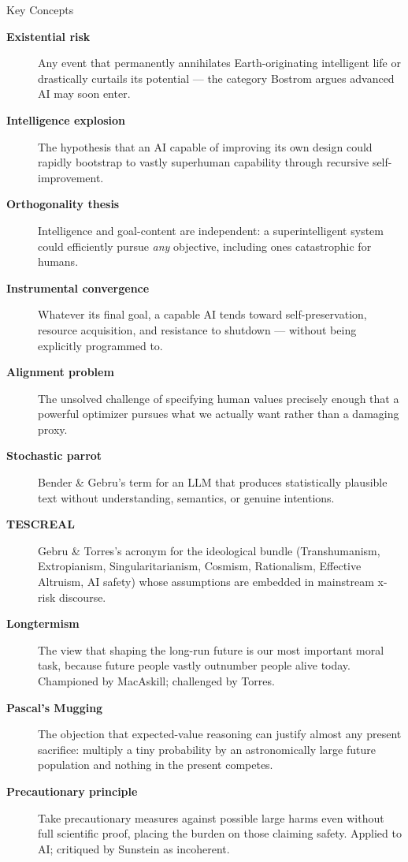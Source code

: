 \documentclass[aspectratio=169,11pt]{beamer}
\begin{document}
\begin{frame}[allowframebreaks]{Key Concepts}
\footnotesize
\begin{description}
    \item[\textbf{Existential risk}] Any event that permanently annihilates Earth-originating intelligent life or drastically curtails its potential --- the category Bostrom argues advanced AI may soon enter.
    \item[\textbf{Intelligence explosion}] The hypothesis that an AI capable of improving its own design could rapidly bootstrap to vastly superhuman capability through recursive self-improvement.
    \item[\textbf{Orthogonality thesis}] Intelligence and goal-content are independent: a superintelligent system could efficiently pursue \emph{any} objective, including ones catastrophic for humans.
    \item[\textbf{Instrumental convergence}] Whatever its final goal, a capable AI tends toward self-preservation, resource acquisition, and resistance to shutdown --- without being explicitly programmed to.
    \item[\textbf{Alignment problem}] The unsolved challenge of specifying human values precisely enough that a powerful optimizer pursues what we actually want rather than a damaging proxy.
    \item[\textbf{Stochastic parrot}] Bender \& Gebru's term for an LLM that produces statistically plausible text without understanding, semantics, or genuine intentions.
    \item[\textbf{TESCREAL}] Gebru \& Torres's acronym for the ideological bundle (Transhumanism, Extropianism, Singularitarianism, Cosmism, Rationalism, Effective Altruism, AI safety) whose assumptions are embedded in mainstream x-risk discourse.
    \item[\textbf{Longtermism}] The view that shaping the long-run future is our most important moral task, because future people vastly outnumber people alive today. Championed by MacAskill; challenged by Torres.
    \item[\textbf{Pascal's Mugging}] The objection that expected-value reasoning can justify almost any present sacrifice: multiply a tiny probability by an astronomically large future population and nothing in the present competes.
    \item[\textbf{Precautionary principle}] Take precautionary measures against possible large harms even without full scientific proof, placing the burden on those claiming safety. Applied to AI; critiqued by Sunstein as incoherent.

\end{description}
\end{frame}
\end{document}
